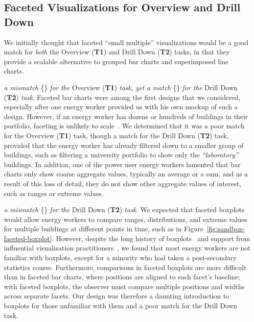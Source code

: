 \documentclass[journal]{vgtc}                %
\newcommand*\match{\textcolor{darkGreen}{\ding{52}}}
\newcommand*\mismatch{\textcolor{red}{\ding{54}}}
\newcommand{\bstart}[1]{\vspace{1mm} \noindent{\textbf{#1:}}}
\begin{document}

\subsection{Faceted Visualizations for Overview and Drill Down}
\label{design-faceting}


We initially thought that faceted ``small multiple'' visualizations would be a good match for {\it both} the Overview ({\bf T1}) and Drill Down ({\bf T2}) tasks, in that they provide a scalable alternative to grouped bar charts and superimposed line charts.

\bstart{Faceted bar charts} {\it a mismatch} \{\mismatch\} {\it for the} Overview ({\bf T1}) {\it task, yet a match} \{\match\} {\it for the} Drill Down ({\bf T2}) {\it task}.
Faceted bar charts were among the first designs that we considered, especially after one energy worker provided us with his own mockup of such a design.
However, if an energy worker has dozens or hundreds of buildings in their portfolio, faceting is unlikely to scale~\cite{Javed2010}. 
We determined that it was a poor match for the Overview ({\bf T1}) task, though a match for the Drill Down ({\bf T2}) task, provided that the energy worker has already filtered down to a smaller group of buildings, such as filtering a university portfolio to show only the {\it ``laboratory''} buildings.
In addition, one of the power user energy workers lamented that bar charts only show coarse aggregate values, typically an average or a sum, and as a result of this loss of detail, they do not show other aggregate values of interest, such as ranges or extreme values.

\bstart{Faceted boxplots} {\it a mismatch} \{\mismatch\} {\it for the} Drill Down ({\bf T2}) {\it task}.
We expected that faceted boxplots would allow energy workers to compare ranges, distributions, and extreme values for multiple buildings at different points in time, such as in Figure~\ref{fig:sandbox-faceted-boxplot}.
However, despite the long history of boxplots~\cite{Wickham2011} and support from influential visualization practitioners~\cite{Few2014}, we found that most energy workers are not familiar with boxplots, except for a minority who had taken a post-secondary statistics course.
Furthermore, comparisons in faceted boxplots are more difficult than in faceted bar charts, where positions are aligned to each facet's baseline; with faceted boxplots, the observer must compare multiple positions and widths across separate facets. 
Our design was therefore a daunting introduction to boxplots for those unfamiliar with them and a poor match for the Drill Down task.
\end{document}
